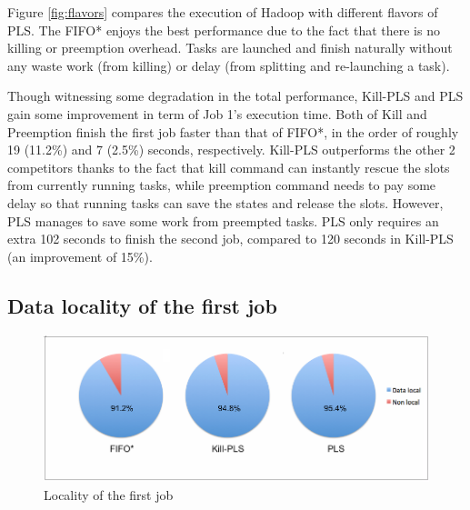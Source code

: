 \documentclass[runningheads,a4paper]{llncs}
\begin{document}
Figure \ref{fig:flavors} compares the execution of Hadoop with different flavors of PLS. The FIFO* enjoys the best performance due to the fact that there is no killing or preemption overhead. Tasks are launched and finish naturally without any waste work (from killing) or delay (from splitting and re-launching a task).

Though witnessing some degradation in the total performance, Kill-PLS and PLS gain some improvement in term of Job 1's execution time. Both of Kill and Preemption finish the first job faster than that of FIFO*, in the order of roughly 19 (11.2\%) and 7 (2.5\%) seconds, respectively. Kill-PLS outperforms the other 2 competitors thanks to the fact that kill command can instantly rescue the slots from currently running tasks, while preemption command needs to pay some delay so that running tasks can save the states and release the slots. However, PLS manages to save some work from preempted tasks. PLS only requires an extra 102 seconds to finish the second job, compared to 120 seconds in Kill-PLS (an improvement of 15\%).

\subsection*{Data locality of the first job}
\begin{figure}[ht]
    \centering
    \includegraphics[width=1\linewidth]{flavorLocality.png}
    \caption{Locality of the first job}
    \label{fig:finalLocality}
\end{figure}
\end{document}
